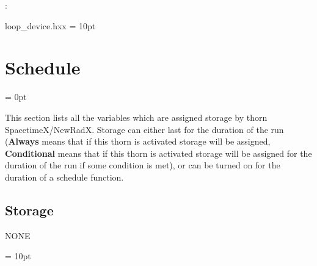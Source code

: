 : 

loop\_device.hxx
\vspace{2mm}\parskip = 10pt 

\section{Schedule} 


\parskip = 0pt


\noindent This section lists all the variables which are assigned storage by thorn SpacetimeX/NewRadX.  Storage can either last for the duration of the run ({\bf Always} means that if this thorn is activated storage will be assigned, {\bf Conditional} means that if this thorn is activated storage will be assigned for the duration of the run if some condition is met), or can be turned on for the duration of a schedule function.


\subsection*{Storage}NONE

\vspace{5mm}\parskip = 10pt 


